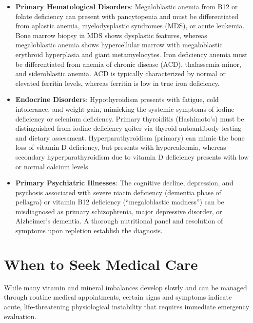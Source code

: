\begin{itemize}
\item \textbf{Primary Hematological Disorders}: Megaloblastic anemia from B12 or folate deficiency can present with pancytopenia and must be differentiated from aplastic anemia, myelodysplastic syndromes (MDS), or acute leukemia. Bone marrow biopsy in MDS shows dysplastic features, whereas megaloblastic anemia shows hypercellular marrow with megaloblastic erythroid hyperplasia and giant metamyelocytes. Iron deficiency anemia must be differentiated from anemia of chronic disease (ACD), thalassemia minor, and sideroblastic anemia. ACD is typically characterized by normal or elevated ferritin levels, whereas ferritin is low in true iron deficiency.
\item \textbf{Endocrine Disorders}: Hypothyroidism presents with fatigue, cold intolerance, and weight gain, mimicking the systemic symptoms of iodine deficiency or selenium deficiency. Primary thyroiditis (Hashimoto's) must be distinguished from iodine deficiency goiter via thyroid autoantibody testing and dietary assessment. Hyperparathyroidism (primary) can mimic the bone loss of vitamin D deficiency, but presents with hypercalcemia, whereas secondary hyperparathyroidism due to vitamin D deficiency presents with low or normal calcium levels.
\item \textbf{Primary Psychiatric Illnesses}: The cognitive decline, depression, and psychosis associated with severe niacin deficiency (dementia phase of pellagra) or vitamin B12 deficiency (``megaloblastic madness'') can be misdiagnosed as primary schizophrenia, major depressive disorder, or Alzheimer's dementia. A thorough nutritional panel and resolution of symptoms upon repletion establish the diagnosis.
\end{itemize}

\section*{When to Seek Medical Care}
While many vitamin and mineral imbalances develop slowly and can be managed through routine medical appointments, certain signs and symptoms indicate acute, life-threatening physiological instability that requires immediate emergency evaluation.

